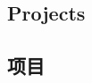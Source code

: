 \documentclass[cv.tex]{subfiles}
\begin{document}
\begin{xen}
\section{Projects}
\end{xen}
\begin{xcn}
\section{项目}
\end{xcn}
\end{document}

